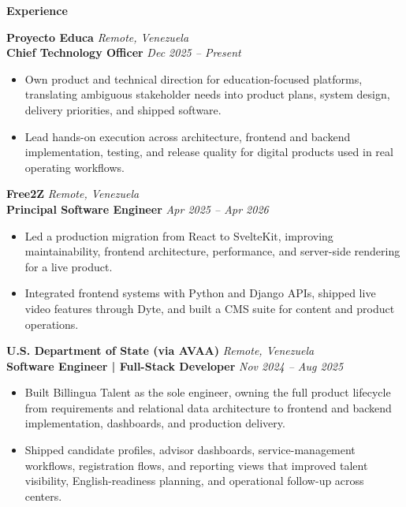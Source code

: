 \documentclass[11pt]{article}
\begin{document}
\vspace{8pt}
\begin{center}
    \textbf{Experience}
\end{center}
\vspace{-4pt}

\textbf{Proyecto Educa} \hfill \textit{Remote, Venezuela} \\
\textbf{Chief Technology Officer} \hfill \textit{Dec 2025 -- Present}
\begin{itemize}
    \item Own product and technical direction for education-focused platforms, translating ambiguous stakeholder needs into product plans, system design, delivery priorities, and shipped software.
    \item Lead hands-on execution across architecture, frontend and backend implementation, testing, and release quality for digital products used in real operating workflows.
\end{itemize}

\vspace{10pt}
\textbf{Free2Z} \hfill \textit{Remote, Venezuela} \\
\textbf{Principal Software Engineer} \hfill \textit{Apr 2025 -- Apr 2026}
\begin{itemize}
    \item Led a production migration from React to SvelteKit, improving maintainability, frontend architecture, performance, and server-side rendering for a live product.
    \item Integrated frontend systems with Python and Django APIs, shipped live video features through Dyte, and built a CMS suite for content and product operations.
\end{itemize}

\vspace{10pt}
\textbf{U.S. Department of State (via AVAA)} \hfill \textit{Remote, Venezuela} \\
\textbf{Software Engineer | Full-Stack Developer} \hfill \textit{Nov 2024 -- Aug 2025}
\begin{itemize}
    \item Built Billingua Talent as the sole engineer, owning the full product lifecycle from requirements and relational data architecture to frontend and backend implementation, dashboards, and production delivery.
    \item Shipped candidate profiles, advisor dashboards, service-management workflows, registration flows, and reporting views that improved talent visibility, English-readiness planning, and operational follow-up across centers.
\end{itemize}
\end{document}
